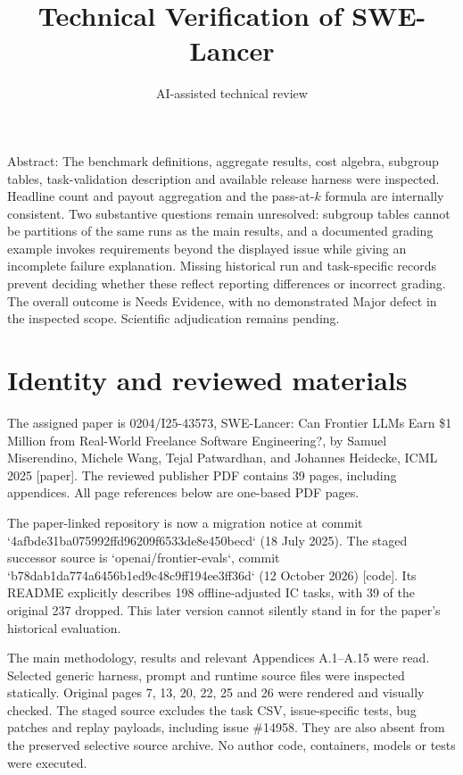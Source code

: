 \documentclass[10pt]{article}
\title{Technical Verification of SWE-Lancer}
\author{AI-assisted technical review}
\date{}
\begin{document}
\maketitle
Abstract: The benchmark definitions, aggregate results, cost algebra, subgroup tables, task-validation description and available release harness were inspected. Headline count and payout aggregation and the pass-at-\(k\) formula are internally consistent. Two substantive questions remain unresolved: subgroup tables cannot be partitions of the same runs as the main results, and a documented grading example invokes requirements beyond the displayed issue while giving an incomplete failure explanation. Missing historical run and task-specific records prevent deciding whether these reflect reporting differences or incorrect grading. The overall outcome is Needs Evidence, with no demonstrated Major defect in the inspected scope. Scientific adjudication remains pending.\par
\section*{Identity and reviewed materials}
The assigned paper is 0204/I25-43573, SWE-Lancer: Can Frontier LLMs Earn \$1 Million from Real-World Freelance Software Engineering?, by Samuel Miserendino, Michele Wang, Tejal Patwardhan, and Johannes Heidecke, ICML 2025 [paper]. The reviewed publisher PDF contains 39 pages, including appendices. All page references below are one-based PDF pages.\par
The paper-linked repository is now a migration notice at commit `4afbde31ba075992ffd96209f6533de8e450becd` (18 July 2025). The staged successor source is `openai/frontier-evals`, commit `b78dab1da774a6456b1ed9c48c9ff194ee3ff36d` (12 October 2026) [code]. Its README explicitly describes 198 offline-adjusted IC tasks, with 39 of the original 237 dropped. This later version cannot silently stand in for the paper’s historical evaluation.\par
The main methodology, results and relevant Appendices A.1–A.15 were read. Selected generic harness, prompt and runtime source files were inspected statically. Original pages 7, 13, 20, 22, 25 and 26 were rendered and visually checked. The staged source excludes the task CSV, issue-specific tests, bug patches and replay payloads, including issue \#14958. They are also absent from the preserved selective source archive. No author code, containers, models or tests were executed.\par
\end{document}
